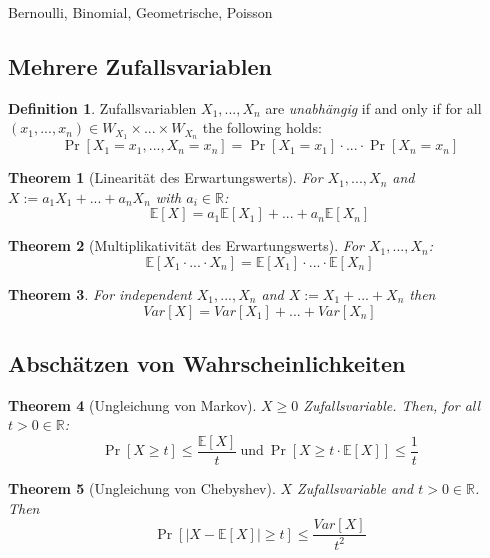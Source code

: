 \documentclass[12pt]{extarticle}
\theoremstyle{definition}
\newtheorem{definition}{Definition}
\theoremstyle{remark}
\theoremstyle{plain}
\newtheorem{theorem}{Theorem}
\theoremstyle{plain}
\theoremstyle{plain}
\newcommand{\E}{\mathbb{E}}
\begin{document}
Bernoulli, Binomial, Geometrische, Poisson

\subsection{Mehrere Zufallsvariablen}

\begin{definition}
    Zufallsvariablen $X_1, ..., X_n$ are \textit{unabhängig} if and only if
    for all $(x_1, ..., x_n) \in W_{X_1} \times ... \times W_{X_n}$ the following holds:
    \[ \Pr[X_1 = x_1, ..., X_n = x_n] = \Pr[X_1 = x_1] \cdot ... \cdot \Pr[X_n = x_n] \]
\end{definition}

\begin{theorem}[Linearität des Erwartungswerts]
    For $X_1, ..., X_n$ and $X := a_1 X_1 + ... + a_n X_n$ with $a_i \in \mathbb{R}$:
    \[ \E[X] = a_1 \E[X_1] + ... + a_n \E[X_n] \]
\end{theorem}

\begin{theorem}[Multiplikativität des Erwartungswerts]
    For $X_1, ..., X_n$:
    \[ \E[X_1 \cdot ... \cdot X_n] = \E[X_1] \cdot ... \cdot \E[X_n] \]
\end{theorem}

\begin{theorem}
    For independent $X_1, ..., X_n$ and $X := X_1 + ... + X_n$ then
    \[ Var[X] = Var[X_1] + ... + Var[X_n] \]
\end{theorem}

\subsection{Abschätzen von Wahrscheinlichkeiten}

\begin{theorem}[Ungleichung von Markov]
    $X \ge 0$ Zufallsvariable. Then, for all $t > 0 \in \mathbb{R}$:
    \[ \Pr[X \ge t] \le \frac{\E[X]}{t}\ \mbox{und}\ \Pr[X \ge t \cdot \E[X]] \le \frac{1}{t} \]
\end{theorem}

\begin{theorem}[Ungleichung von Chebyshev]
    $X$ Zufallsvariable and $t > 0 \in \mathbb{R}$. Then
    \[ \Pr[|X - \E[X]| \ge t] \le \frac{Var[X]}{t^2} \]
\end{theorem}
\end{document}
